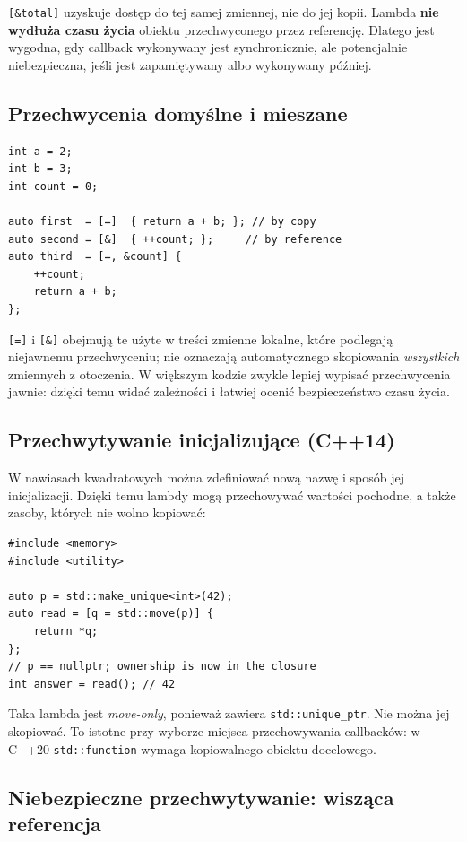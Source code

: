 \texttt{[\&total]} uzyskuje dostęp do tej samej zmiennej, nie do jej
kopii. Lambda \textbf{nie wydłuża czasu życia} obiektu przechwyconego
przez referencję. Dlatego jest wygodna, gdy callback wykonywany jest
synchronicznie, ale potencjalnie niebezpieczna, jeśli jest zapamiętywany
albo wykonywany później.

\subsection{Przechwycenia domyślne i mieszane}

\begin{lstlisting}
int a = 2;
int b = 3;
int count = 0;

auto first  = [=]  { return a + b; }; // by copy
auto second = [&]  { ++count; };     // by reference
auto third  = [=, &count] {
    ++count;
    return a + b;
};
\end{lstlisting}

\texttt{[=]} i \texttt{[\&]} obejmują te użyte w treści zmienne lokalne,
które podlegają niejawnemu przechwyceniu; nie oznaczają automatycznego
skopiowania \emph{wszystkich} zmiennych z otoczenia. W większym kodzie
zwykle lepiej wypisać przechwycenia jawnie: dzięki temu widać zależności
i łatwiej ocenić bezpieczeństwo czasu życia.

\subsection{Przechwytywanie inicjalizujące (C++14)}

W nawiasach kwadratowych można zdefiniować nową nazwę i sposób jej
inicjalizacji. Dzięki temu lambdy mogą przechowywać wartości pochodne,
a także zasoby, których nie wolno kopiować:

\begin{lstlisting}
#include <memory>
#include <utility>

auto p = std::make_unique<int>(42);
auto read = [q = std::move(p)] {
    return *q;
};
// p == nullptr; ownership is now in the closure
int answer = read(); // 42
\end{lstlisting}

Taka lambda jest \emph{move-only}, ponieważ zawiera
\texttt{std::unique\_ptr}. Nie można jej skopiować. To istotne przy
wyborze miejsca przechowywania callbacków: w C++20
\texttt{std::function} wymaga kopiowalnego obiektu docelowego.

\subsection{Niebezpieczne przechwytywanie: wisząca referencja}

